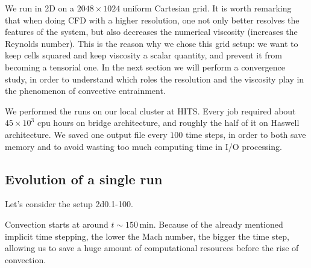 We run in 2D on a $2048 \times 1024$ uniform Cartesian grid. It is worth remarking that when doing CFD with a higher resolution, one not only better resolves the features of the system, but also decreases the numerical viscosity (increases the Reynolds number). This is the reason why we chose this grid setup: we want to keep cells squared and keep viscosity a scalar quantity, and prevent it from becoming a tensorial one. In the next section we will perform a convergence study, in order to understand which roles the resolution and the viscosity play in the phenomenon of convective entrainment.

We performed the runs on our local cluster at HITS. Every job required about $45 \times 10^{3}$ cpu hours on bridge architecture, and roughly the half of it on Haswell architecture. We saved one output file every $100$ time steps, in order to both save memory and to avoid wasting too much computing time in I/O processing.


\subsection{Evolution of a single run}\label{single2d}

Let's consider the setup 2d0.1-100. 

Convection starts at around $t \sim 150 \, \mathrm{min}$. Because of the already mentioned implicit time stepping, the lower the Mach number, the bigger the time step, allowing us to save a huge amount of computational resources before the rise of convection. 

